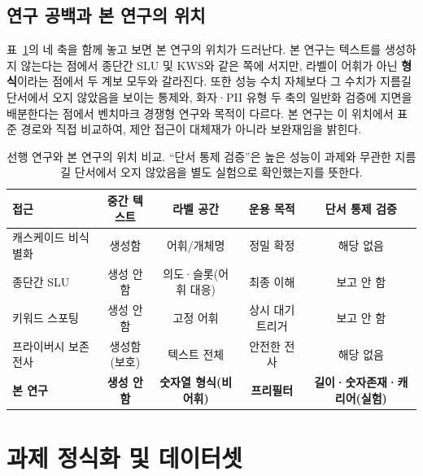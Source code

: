 \documentclass[11pt]{article}
\renewcommand{\emph}[1]{\textbf{#1}}
\begin{document}
\subsection{연구 공백과 본 연구의 위치}
표~\ref{tab:related}의 네 축을 함께 놓고 보면 본 연구의 위치가 드러난다. 본 연구는 텍스트를
생성하지 않는다는 점에서 종단간 SLU 및 KWS와 같은 쪽에 서지만, 라벨이 어휘가 아닌
\emph{형식}이라는 점에서 두 계보 모두와 갈라진다. 또한 성능 수치 자체보다 그 수치가 지름길
단서에서 오지 않았음을 보이는 통제와, 화자·PII 유형 두 축의 일반화 검증에 지면을 배분한다는
점에서 벤치마크 경쟁형 연구와 목적이 다르다. 본 연구는 이 위치에서 표준 경로와 직접 비교하여,
제안 접근이 대체재가 아니라 보완재임을 밝힌다.

\begin{table}[!htbp]
\centering
\caption{선행 연구와 본 연구의 위치 비교. ``단서 통제 검증''은 높은 성능이 과제와 무관한
지름길 단서에서 오지 않았음을 별도 실험으로 확인했는지를 뜻한다.}
\label{tab:related}
\footnotesize
\setlength{\tabcolsep}{3.5pt}
\begin{tabular}{lcccc}
\toprule
접근 & 중간 텍스트 & 라벨 공간 & 운용 목적 & 단서 통제 검증 \\
\midrule
캐스케이드 비식별화~\cite{cohn2019audiodeid,azurepii,gouvea2023trustera} & 생성함 & 어휘/개체명 & 정밀 확정 & 해당 없음 \\
종단간 SLU~\cite{serdyuk2018towards,lugosch2019pretrain,palogiannidi2020asrfree,tomashenko2019recent,wang2023jointctc} & 생성 안 함 & 의도·슬롯(어휘 대응) & 최종 이해 & 보고 안 함 \\
키워드 스포팅~\cite{sainath2015cnnkws,tang2018resnetkws,berg2021keyword} & 생성 안 함 & 고정 어휘 & 상시 대기 트리거 & 보고 안 함 \\
프라이버시 보존 전사~\cite{ahmed2020preech} & 생성함(보호) & 텍스트 전체 & 안전한 전사 & 해당 없음 \\
\textbf{본 연구} & \textbf{생성 안 함} & \textbf{숫자열 형식(비어휘)} & \textbf{프리필터} & \textbf{길이·숫자존재·캐리어(실험)} \\
\bottomrule
\end{tabular}
\end{table}

\section{과제 정식화 및 데이터셋}\label{sec:data}
\end{document}
